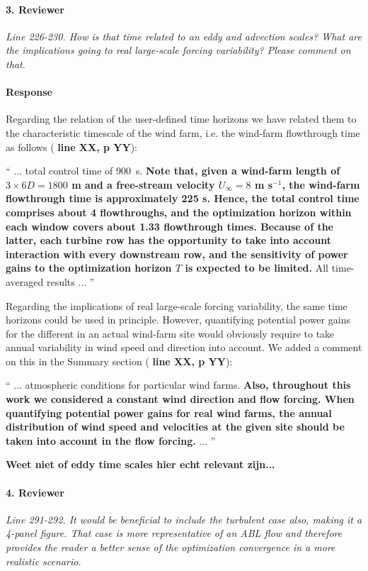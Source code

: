 \documentclass[]{article}
\newcommand{\red}[1]{\textbf{\color{red} #1}}
\newcommand{\revision}[1]{\textbf{#1}}
\begin{document}
\hrulefill

\paragraph{3. Reviewer} \textit{Line 226-230. How is that time related to an eddy and advection scales? What are the implications going to real large-scale forcing variability? Please comment on that.}

\paragraph{Response} Regarding the relation of the user-defined time horizons we have related them to the characteristic timescale of the wind farm, i.e. the wind-farm flowthrough time as follows (\red{line XX, p YY}):

``
... total control time of 900~s.  \revision{Note that, given a wind-farm length of $3 \times 6D = 1 800$ m and a free-stream velocity $U_\infty = 8$ m s$^{-1}$, the wind-farm flowthrough time is approximately 225 s. Hence, the total control time comprises about 4 flowthroughs, and the optimization horizon within each window covers about 1.33 flowthrough times. Because of the latter, each turbine row has the opportunity to take into account interaction with every downstream row, and the sensitivity of power gains to the optimization horizon $T$ is expected to be limited.} All time-averaged results ...
''

Regarding the implications of real large-scale forcing variability, the same time horizons could be used in principle. However, quantifying potential power gains for the different in an actual wind-farm site would obviously require to take annual variability in wind speed and direction into account. We added a comment on this in the Summary section (\red{line XX, p YY}): 

`` 
... atmospheric conditions for particular wind farms. \revision{Also, throughout this work we considered a constant wind direction and flow forcing. When quantifying potential power gains for real wind farms, the annual distribution of wind speed and velocities at the given site should be taken into account in the flow forcing.} ...
''

\red{Weet niet of eddy time scales hier echt relevant zijn...}

\hrulefill

\paragraph{4. Reviewer} \textit{Line 291-292. It would be beneficial to include the turbulent case also, making it a 4-panel figure. That case is more representative of an ABL flow and therefore provides the reader a better sense of the optimization convergence in a more realistic scenario.}
\end{document}
